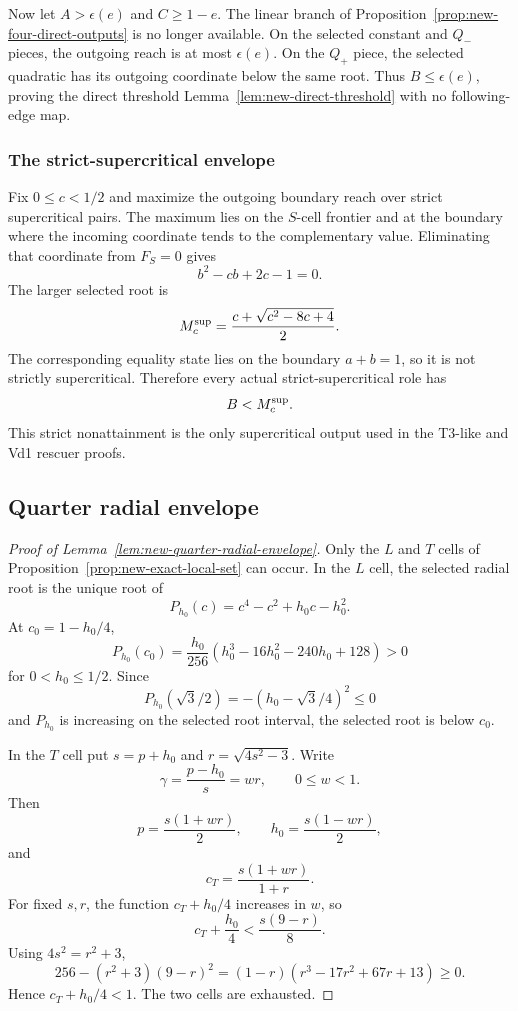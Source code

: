 Now let $A>\epsilon(e)$ and $C\ge1-e$.  The linear branch of
Proposition~\ref{prop:new-four-direct-outputs} is no longer available.  On
the selected constant and $Q_-$ pieces, the outgoing reach is at most
$\epsilon(e)$.  On the $Q_+$ piece, the selected quadratic has its outgoing
coordinate below the same root.  Thus $B\le\epsilon(e)$, proving the direct
threshold Lemma~\ref{lem:new-direct-threshold} with no following-edge map.

\subsubsection{The strict-supercritical envelope}
\label{subsec:calc-strict-supercritical}

Fix $0\le c<1/2$ and maximize the outgoing boundary reach over strict
supercritical pairs.  The maximum lies on the $S$-cell frontier and at the
boundary where the incoming coordinate tends to the complementary value.
Eliminating that coordinate from $F_S=0$ gives
\[
 b^2-cb+2c-1=0.
\]
The larger selected root is
\[
 M_c^{\rm sup}=\frac{c+\sqrt{c^2-8c+4}}2.
\]
The corresponding equality state lies on the boundary $a+b=1$, so it is not
strictly supercritical.  Therefore every actual strict-supercritical role has
\[
 B<M_c^{\rm sup}.
\]
This strict nonattainment is the only supercritical output used in the T3-like
and Vd1 rescuer proofs.



\subsection{Quarter radial envelope}
\label{subsec:calc-quarter-envelope}

\begin{proof}[Proof of Lemma~\ref{lem:new-quarter-radial-envelope}]
Only the $L$ and $T$ cells of Proposition~\ref{prop:new-exact-local-set} can
occur.  In the $L$ cell, the selected radial root is the unique root of
\[
 P_{h_0}(c)=c^4-c^2+h_0c-h_0^2.
\]
At $c_0=1-h_0/4$,
\[
 P_{h_0}(c_0)
 =\frac{h_0}{256}
 (h_0^3-16h_0^2-240h_0+128)>0
\]
for $0<h_0\le1/2$.  Since
\[
 P_{h_0}(\sqrt3/2)=-(h_0-\sqrt3/4)^2\le0
\]
and $P_{h_0}$ is increasing on the selected root interval, the selected root
is below $c_0$.

In the $T$ cell put $s=p+h_0$ and $r=\sqrt{4s^2-3}$.  Write
\[
 \gamma=\frac{p-h_0}{s}=wr,
 \qquad0\le w<1.
\]
Then
\[
 p=\frac{s(1+wr)}2,
 \qquad h_0=\frac{s(1-wr)}2,
\]
and
\[
 c_T=\frac{s(1+wr)}{1+r}.
\]
For fixed $s,r$, the function $c_T+h_0/4$ increases in $w$, so
\[
 c_T+\frac{h_0}{4}
 <\frac{s(9-r)}8.
\]
Using $4s^2=r^2+3$,
\[
256-(r^2+3)(9-r)^2
=(1-r)(r^3-17r^2+67r+13)\ge0.
\]
Hence $c_T+h_0/4<1$.  The two cells are exhausted.
\end{proof}

